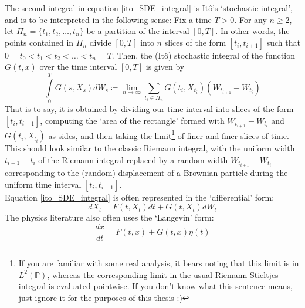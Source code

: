 The second integral in equation \eqref{ito_SDE_integral} is It\^o's `stochastic integral', and is to be interpreted in the following sense: Fix a time $T > 0$. For any $n\geq2$, let $\Pi_n = \{t_1,t_2,\ldots,t_n\}$ be a partition of the interval $[0,T]$. In other words, the points contained in $\Pi_n$ divide $[0,T]$ into $n$ slices of the form $[t_i,t_{i+1}]$ such that $0 = t_0 < t_1 < t_2 < \ldots < t_n = T$. Then, the (It\^o) stochastic integral of the function $G(t,x)$ over the time interval $[0,T]$ is given by
\begin{equation*}
	\int\limits_{0}^{T} G(s,X_s)dW_s \coloneqq \lim_{n \to \infty} \sum\limits_{t_i \in \Pi_n}G(t_i,X_{t_i})(W_{t_{i+1}}-W_{t_i})  
\end{equation*}
That is to say, it is obtained by dividing our time interval into slices of the form $[t_i,t_{i+1}]$, computing the `area of the rectangle' formed with $W_{t_{i+1}}-W_{t_i}$ and $G(t_i,X_{t_i})$ as sides, and then taking the limit\footnote{If you are familiar with some real analysis, it bears noting that this limit is in $L^2(\mathbb{P})$, whereas the corresponding limit in the usual Riemann-Stieltjes integral is evaluated pointwise. If you don't know what this sentence means, just ignore it for the purposes of this thesis :)} of finer and finer slices of time. This should look similar to the classic Riemann integral, with the uniform width $t_{i+1}-t_i$ of the Riemann integral replaced by a random width $W_{t_{i+1}}-W_{t_i}$ corresponding to the (random) displacement of a Brownian particle during the uniform time interval $[t_i,t_{i+1}]$.\\
Equation \eqref{ito_SDE_integral} is often represented in the `differential' form:
\begin{equation}
	\label{ito_SDE_diff}
	dX_t = F(t,X_t)dt + G(t,X_t)dW_t
\end{equation}
The physics literature also often uses the `Langevin' form:
\begin{equation}
	\label{ito_langevin}
	\frac{dx}{dt} = F(t,x) + G(t,x)\eta(t)
\end{equation}
